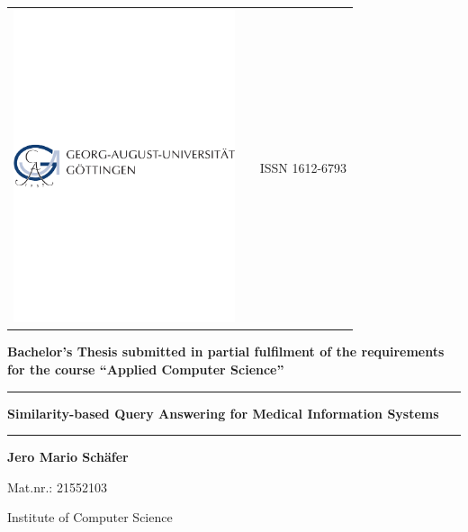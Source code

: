 
\newcommand{\Rule}{\rule{\textwidth}{1mm}}

\begin{titlepage}
    \singlespacing

    \normalsize
    \begin{tabularx}{\textwidth}{lXr}
        \includegraphics[width=6.5cm]{img/ugo-logo.pdf} & & ISSN 1612-6793\\
    \end{tabularx}

    \vspace{1cm}
    
    \centering
    \sffamily\bfseries\LARGE Bachelor's Thesis
    submitted in partial fulfilment of the
    requirements for the course ``Applied Computer Science''

    \vspace{1mm}

    \Rule\vspace{5mm}
    \sffamily\bfseries\Huge
        Similarity-based Query Answering for Medical Information Systems
    \vspace{1mm}\Rule

    \vspace{1.5cm}

    \sffamily\bfseries\Large Jero Mario Schäfer\par Mat.nr.: 21552103\par
    \vspace{0.5cm}
    Institute of Computer Science

    \vspace{1.5cm}


\end{titlepage}
